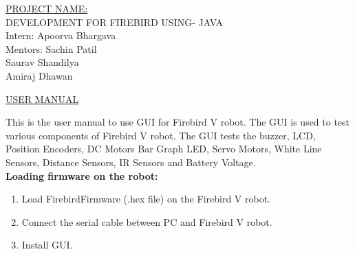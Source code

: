 \documentclass{article}
\begin{document}
	\begin{center}
		\Huge \color{red}\underline{PROJECT NAME:} \vspace{4cm} \\
		\huge \color{green} DEVELOPMENT FOR FIREBIRD USING- JAVA \vspace{4cm} \\
		\color{black}\Large Intern: Apoorva Bhargava \vspace{3cm} \\
		\Large Mentors: Sachin Patil \\
		\Large \qquad \qquad \qquad \quad Saurav Shandilya \\
		\Large \qquad \qquad \qquad Amiraj Dhawan 
	\end{center}
	\newpage
	\begin{center}
		\huge \color{blue}\underline{USER MANUAL}
	\end{center} 
	\vspace{1cm}
	This is the user manual to use GUI for Firebird V robot. The GUI is used to test various components of Firebird V robot. The GUI tests the buzzer, LCD, Position Encoders, DC Motors Bar Graph LED, Servo Motors, White Line Sensors, Distance Sensors, IR Sensors and Battery Voltage. \vspace{1cm} \\
	\textbf{\large Loading firmware on the robot:}
	\begin{enumerate}
		\item Load FirebirdFirmware (.hex file) on the Firebird V robot.
		\item Connect the serial cable between PC and Firebird V robot.
		\item Install GUI. 
	\end{enumerate}
	
\end{document}
